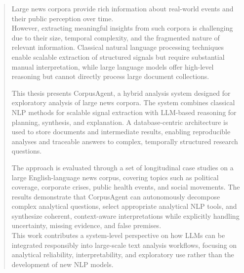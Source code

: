 
\begin{abstract}
\addchaptertocentry{\abstractname} %
Large news corpora provide rich information about real-world events and their public perception over time.\\
However, extracting meaningful insights from such corpora is challenging due to their size, temporal complexity, and the fragmented nature of relevant information. Classical natural language processing techniques enable scalable extraction of structured signals but require substantial manual interpretation, while large language models offer high-level reasoning but cannot directly process large document collections.

This thesis presents CorpusAgent, a hybrid analysis system designed for exploratory analysis of large news corpora. The system combines classical NLP methods for scalable signal extraction with LLM-based reasoning for planning, synthesis, and explanation. A database-centric architecture is used to store documents and intermediate results, enabling reproducible analyses and traceable answers to complex, temporally structured research questions.

The approach is evaluated through a set of longitudinal case studies on a large English-language news corpus, covering topics such as political coverage, corporate crises, public health events, and social movements. The results demonstrate that CorpusAgent can autonomously decompose complex analytical questions, select appropriate analytical NLP tools, and synthesize coherent, context-aware interpretations while explicitly handling uncertainty, missing evidence, and false premises. \\
This work contributes a system-level perspective on how LLMs can be integrated responsibly into large-scale text analysis workflows, focusing on analytical reliability, interpretability, and exploratory use rather than the development of new NLP models.
\end{abstract}